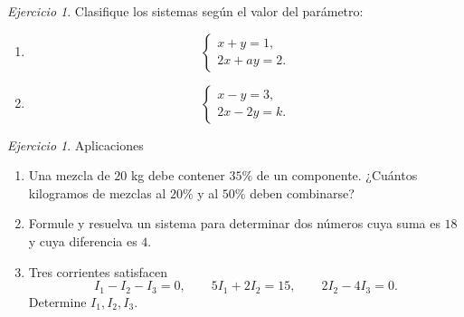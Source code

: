 \documentclass[12pt]{article}
\theoremstyle{remark}
\newtheorem{Ejer}[definicion]{Ejercicio}
\begin{document}
\begin{Ejer} 
Clasifique los sistemas según el valor del parámetro:
\begin{enumerate}

\item
\[
\begin{cases}
x+y=1,\\
2x+ay=2.
\end{cases}
\]
\item
\[
\begin{cases}
x-y=3,\\
2x-2y=k.
\end{cases}
\]
\end{enumerate}
\end{Ejer}
\begin{Ejer} Aplicaciones
\begin{enumerate}
\item Una mezcla de $20$ kg debe contener $35\%$ de un componente. ¿Cuántos kilogramos de mezclas
al $20\%$ y al $50\%$ deben combinarse?
\item Formule y resuelva un sistema para determinar dos números cuya suma es $18$ y cuya diferencia
es $4$.
\item Tres corrientes satisfacen
\[
I_1-I_2-I_3=0,\qquad 5I_1+2I_2=15,\qquad 2I_2-4I_3=0.
\]
Determine $I_1,I_2,I_3$.
\end{enumerate}
\end{Ejer}
\end{document}
